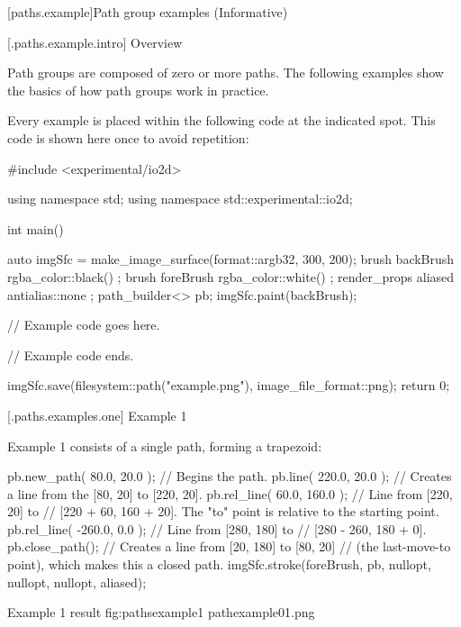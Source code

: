 

 [paths.example]{Path group examples (Informative)}

 [\iotwod.paths.example.intro] {Overview}

\pnum
Path groups are composed of zero or more paths. The following examples show the basics of how path groups work in practice.

\pnum
Every example is placed within the following code at the indicated spot. This code is shown here once to avoid repetition:

\begin{codeblock}
#include <experimental/io2d>

using namespace std;
using namespace std::experimental::io2d;

int main() {
  auto imgSfc = make_image_surface(format::argb32, 300, 200);
  brush backBrush{ rgba_color::black() };
  brush foreBrush{ rgba_color::white() };
  render_props aliased{ antialias::none };
  path_builder<> pb{};
  imgSfc.paint(backBrush);
  
  // Example code goes here.

  // Example code ends.
  
  imgSfc.save(filesystem::path("example.png"), image_file_format::png);
  return 0;
}
\end{codeblock}

 [\iotwod.paths.examples.one] {Example 1}

\pnum
Example 1 consists of a single path, forming a trapezoid:

\begin{codeblock}
  pb.new_path({ 80.0, 20.0 }); // Begins the path.
  pb.line({ 220.0, 20.0 }); // Creates a line from the [80, 20] to [220, 20].
  pb.rel_line({ 60.0, 160.0 }); // Line from [220, 20] to
    // [220 + 60, 160 + 20]. The "to" point is relative to the starting point.
  pb.rel_line({ -260.0, 0.0 }); // Line from [280, 180] to 
    // [280 - 260, 180 + 0].
  pb.close_path(); // Creates a line from [20, 180] to [80, 20] 
    // (the last-move-to point), which makes this a closed path.
  imgSfc.stroke(foreBrush, pb, nullopt, nullopt, nullopt, aliased);
\end{codeblock}

\begin{importgraphiciotwod}
{Example 1 result}
{fig:pathsexample1}
{pathexample01.png}
\end{importgraphiciotwod}


